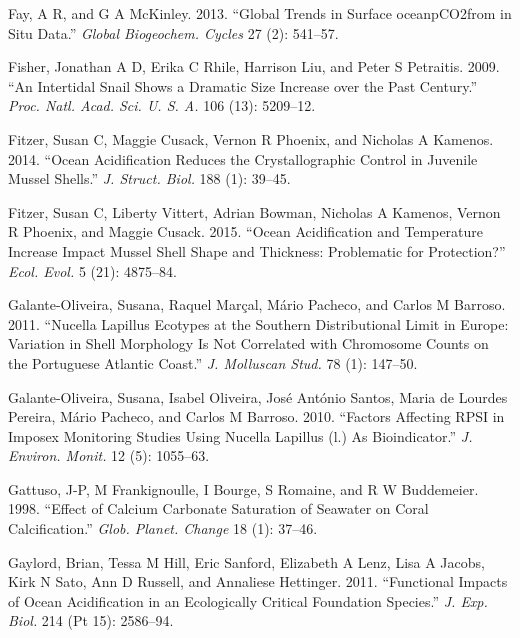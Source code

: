 \documentclass[smallextended]{svjour3}       %
\newlength{\cslhangindent}
\newenvironment{CSLReferences}[2] %
 {%
  \setlength{\parindent}{0pt}
  \ifodd #1 \everypar{\setlength{\hangindent}{\cslhangindent}}\ignorespaces\fi
  \ifnum #2 > 0
  \setlength{\parskip}{#2\baselineskip}
  \fi
 }%
 {}
\begin{document}
\begin{CSLReferences}{1}{0}
\leavevmode{}%
Fay, A R, and G A McKinley. 2013. {``Global Trends in Surface
{oceanpCO2from} in Situ Data.''} \emph{Global Biogeochem. Cycles} 27
(2): 541--57.

\leavevmode{}%
Fisher, Jonathan A D, Erika C Rhile, Harrison Liu, and Peter S
Petraitis. 2009. {``An Intertidal Snail Shows a Dramatic Size Increase
over the Past Century.''} \emph{Proc. Natl. Acad. Sci. U. S. A.} 106
(13): 5209--12.

\leavevmode{}%
Fitzer, Susan C, Maggie Cusack, Vernon R Phoenix, and Nicholas A
Kamenos. 2014. {``Ocean Acidification Reduces the Crystallographic
Control in Juvenile Mussel Shells.''} \emph{J. Struct. Biol.} 188 (1):
39--45.

\leavevmode{}%
Fitzer, Susan C, Liberty Vittert, Adrian Bowman, Nicholas A Kamenos,
Vernon R Phoenix, and Maggie Cusack. 2015. {``Ocean Acidification and
Temperature Increase Impact Mussel Shell Shape and Thickness:
Problematic for Protection?''} \emph{Ecol. Evol.} 5 (21): 4875--84.

\leavevmode{}%
Galante-Oliveira, Susana, Raquel Marçal, Mário Pacheco, and Carlos M
Barroso. 2011. {``Nucella Lapillus Ecotypes at the Southern
Distributional Limit in Europe: Variation in Shell Morphology Is Not
Correlated with Chromosome Counts on the Portuguese Atlantic Coast.''}
\emph{J. Molluscan Stud.} 78 (1): 147--50.

\leavevmode{}%
Galante-Oliveira, Susana, Isabel Oliveira, José António Santos, Maria de
Lourdes Pereira, Mário Pacheco, and Carlos M Barroso. 2010. {``Factors
Affecting {RPSI} in Imposex Monitoring Studies Using Nucella Lapillus
(l.) As Bioindicator.''} \emph{J. Environ. Monit.} 12 (5): 1055--63.

\leavevmode{}%
Gattuso, J-P, M Frankignoulle, I Bourge, S Romaine, and R W Buddemeier.
1998. {``Effect of Calcium Carbonate Saturation of Seawater on Coral
Calcification.''} \emph{Glob. Planet. Change} 18 (1): 37--46.

\leavevmode{}%
Gaylord, Brian, Tessa M Hill, Eric Sanford, Elizabeth A Lenz, Lisa A
Jacobs, Kirk N Sato, Ann D Russell, and Annaliese Hettinger. 2011.
{``Functional Impacts of Ocean Acidification in an Ecologically Critical
Foundation Species.''} \emph{J. Exp. Biol.} 214 (Pt 15): 2586--94.


\end{CSLReferences}
\end{document}
